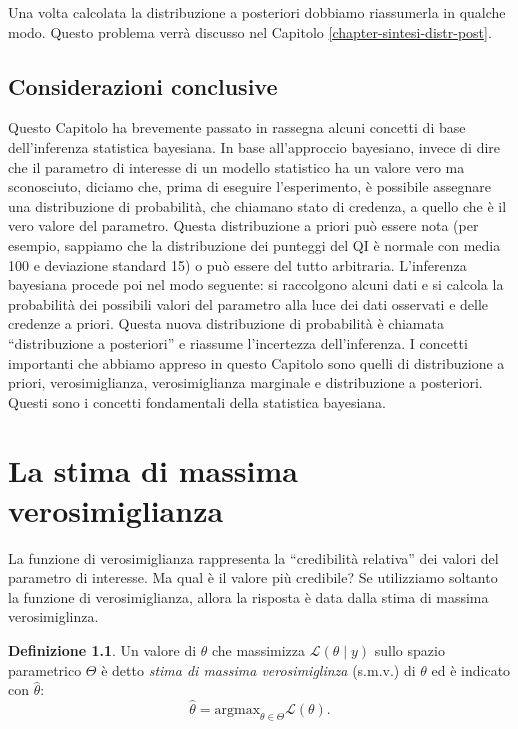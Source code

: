 \documentclass[
  10pt,
  italian,
  a4paper,
  extrafontsizes,onecolumn,openright
  ]{memoir}
\theoremstyle{definition}
\newtheorem{definition}{Definizione}[chapter]
\theoremstyle{definition}
\theoremstyle{definition}
\theoremstyle{definition}
\theoremstyle{remark}
\begin{document}
Una volta calcolata la distribuzione a posteriori dobbiamo riassumerla in qualche modo. Questo problema verrà discusso nel Capitolo \ref{chapter-sintesi-distr-post}.

\hypertarget{considerazioni-conclusive}{%
\section*{Considerazioni conclusive}\label{considerazioni-conclusive}}

Questo Capitolo ha brevemente passato in rassegna alcuni concetti di base dell'inferenza statistica bayesiana. In base all'approccio bayesiano, invece di dire che il parametro di interesse di un modello statistico ha un valore vero ma sconosciuto, diciamo che, prima di eseguire l'esperimento, è possibile assegnare una distribuzione di probabilità, che chiamano stato di credenza, a quello che è il vero valore del parametro. Questa distribuzione a priori può essere nota (per esempio, sappiamo che la distribuzione dei punteggi del QI è normale con media 100 e deviazione standard 15) o può essere del tutto arbitraria. L'inferenza bayesiana procede poi nel modo seguente: si raccolgono alcuni dati e si calcola la probabilità dei possibili valori del parametro alla luce dei dati osservati e delle credenze a priori. Questa nuova distribuzione di probabilità è chiamata ``distribuzione a posteriori'' e riassume l'incertezza dell'inferenza. I concetti importanti che abbiamo appreso in questo Capitolo sono quelli di distribuzione a priori, verosimiglianza, verosimiglianza marginale e distribuzione a posteriori. Questi sono i concetti fondamentali della statistica bayesiana.

\hypertarget{appendix-appendix}{%
\appendix}


\hypertarget{appendix:max-like}{%
\chapter{La stima di massima verosimiglianza}\label{appendix:max-like}}

La funzione di verosimiglianza rappresenta la ``credibilità relativa'' dei valori del parametro di interesse. Ma qual è il valore più credibile? Se utilizziamo soltanto la funzione di verosimiglianza, allora la risposta è data dalla stima di massima verosimiglinza.

\begin{definition}
Un valore di \(\theta\) che massimizza \(\mathcal{L}(\theta \mid y)\) sullo spazio parametrico \(\Theta\) è detto \emph{stima di massima verosimiglinza} (s.m.v.) di \(\theta\) ed è indicato con \(\hat{\theta}\):
\begin{equation}
\hat{\theta} = \text{argmax}_{\theta \in \Theta} \mathcal{L}(\theta).
\end{equation}
\end{definition}
\end{document}
